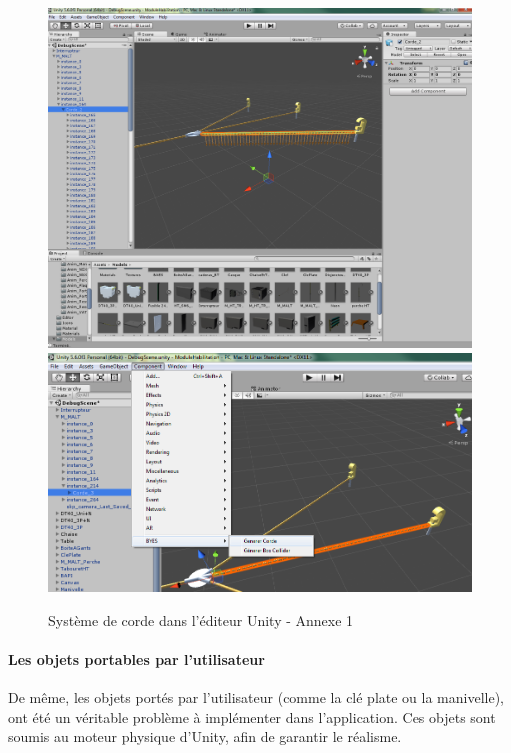 \documentclass[a4paper]{article}
\begin{document}
    \begin{figure}[H]
        \centering
        \includegraphics[scale=0.3]{img/CordeUnity}
        \includegraphics[scale=0.4]{img/GenererCorde}
        \caption{Système de corde dans l'éditeur Unity - Annexe 1}
    \end{figure}

    \paragraph{Les objets portables par l'utilisateur}

    De même, les objets portés par l'utilisateur (comme la clé plate ou la manivelle), ont été un véritable problème à implémenter dans l'application. Ces objets sont soumis au moteur physique d'Unity, afin de garantir le réalisme. \\
\end{document}

